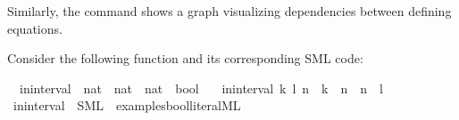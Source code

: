 \begin{isabellebody}
\begin{isamarkuptext}
  Similarly, the \isa{{\isasymCODEDEPS}} command shows a graph
  visualizing dependencies between defining equations.%
\end{isamarkuptext}%
\isamarkuptrue%
%
\isamarkuptrue%
%
\isamarkuptrue%
%
\begin{isamarkuptext}%
Consider the following function and its corresponding
  SML code:%
\end{isamarkuptext}%
\isamarkuptrue%
\isamarkupfalse%
\isanewline
\ \ in{\isacharunderscore}interval\ {\isacharcolon}{\isacharcolon}\ {\isachardoublequoteopen}nat\ {\isasymtimes}\ nat\ {\isasymRightarrow}\ nat\ {\isasymRightarrow}\ bool{\isachardoublequoteclose}\ \isanewline
\ \ {\isachardoublequoteopen}in{\isacharunderscore}interval\ {\isacharparenleft}k{\isacharcomma}\ l{\isacharparenright}\ n\ {\isasymlongleftrightarrow}\ k\ {\isasymle}\ n\ {\isasymand}\ n\ {\isasymle}\ l{\isachardoublequoteclose}%
\isadelimtt
%
\endisadelimtt
%
\isatagtt
%
\endisatagtt
{\isafoldtt}%
%
\isadelimtt
%
\endisadelimtt
{}\isamarkupfalse%
\ in{\isacharunderscore}interval\ \ SML\ \ {\isachardoublequoteopen}examples{\isacharslash}bool{\isacharunderscore}literal{\isachardot}ML{\isachardoublequoteclose}%
\begin{isamarkuptext}%


\end{isamarkuptext}
\end{isabellebody}
